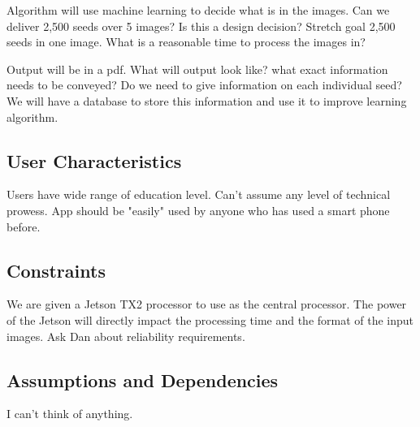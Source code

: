 \documentclass[onecolumn, draftclsnofoot,10pt, compsoc]{IEEEtran}
\begin{document}
Algorithm will use machine learning to decide what is in the images.
Can we deliver 2,500 seeds over 5 images?
Is this a design decision?
Stretch goal 2,500 seeds in one image.
What is a reasonable time to process the images in?

Output will be in a pdf.
What will output look like?
what exact information needs to be conveyed?
Do we need to give information on each individual seed?
We will have a database to store this information and use it to improve learning algorithm.

\subsection{User Characteristics}
Users have wide range of education level.
Can't assume any level of technical prowess.
App should be "easily" used by anyone who has used a smart phone before. %

\subsection{Constraints}
We are given a Jetson TX2 processor to use as the central processor.
The power of the Jetson will directly impact the processing time and the format of the input images.
Ask Dan about reliability requirements.

\subsection{Assumptions and Dependencies}
I can't think of anything.
\end{document}
